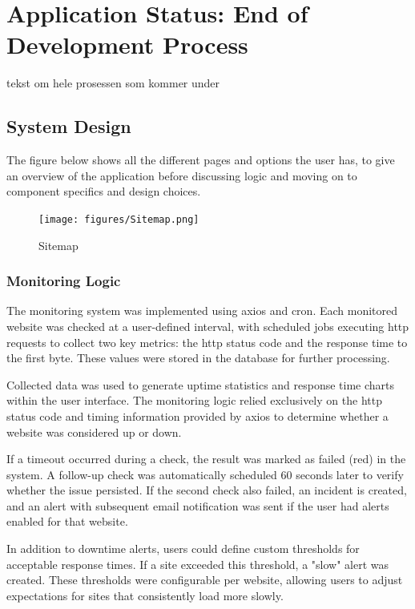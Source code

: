 \section{Application Status: End of Development Process}
\label{sec:status_at_completion}
tekst om hele prosessen som kommer under

\subsection{System Design}
The figure below shows all the different pages and options the user has, to give an overview of the application before discussing logic and moving on to component specifics and design choices.

\begin{figure}[htbp]
        \centering
        \texttt{[image: figures/Sitemap.png]}
        \caption{Sitemap}
        \label{sfig:sitemap}
\end{figure} 

\subsubsection{Monitoring Logic}
\label{subsubsec:monitoring_logic}
The monitoring system was implemented using \gls{axios} and \gls{cron}. Each monitored website was checked at a user-defined interval, with scheduled jobs executing \acrshort{http} requests to collect two key metrics: the \acrshort{http} status code and the response time to the first byte. These values were stored in the database for further processing.

Collected data was used to generate uptime statistics and response time charts within the user interface. The monitoring logic relied exclusively on the \acrshort{http} status code and timing information provided by \gls{axios} to determine whether a website was considered up or down.

If a timeout occurred during a check, the result was marked as failed (red) in the system. A follow-up check was automatically scheduled 60 seconds later to verify whether the issue persisted. If the second check also failed, an incident is created, and an alert with subsequent email notification was sent if the user had alerts enabled for that website.

In addition to downtime alerts, users could define custom thresholds for acceptable response times. If a site exceeded this threshold, a "slow" alert was created. These thresholds were configurable per website, allowing users to adjust expectations for sites that consistently load more slowly.


